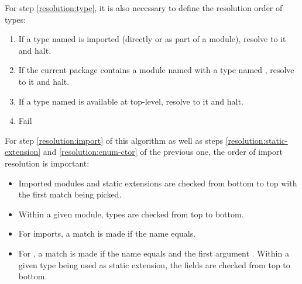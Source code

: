 For step \ref{resolution:type}, it is also necessary to define the resolution order of types:

\begin{enumerate}
	\item\label{resolution:import} If a type named  is imported (directly or as part of a module), resolve to it and halt.
	\item If the current package contains a module named  with a type named , resolve to it and halt.
	\item If a type named  is available at top-level, resolve to it and halt.
	\item Fail
\end{enumerate}

For step \ref{resolution:import} of this algorithm as well as steps \ref{resolution:static-extension} and \ref{resolution:enum-ctor} of the previous one, the order of import resolution is important:

\begin{itemize}
	\item Imported modules and static extensions are checked from bottom to top with the first match being picked.
	\item Within a given module, types are checked from top to bottom.
	\item For imports, a match is made if the name equals.
	\item For , a match is made if the name equals and the first argument . Within a given type being used as static extension, the fields are checked from top to bottom.
\end{itemize}
